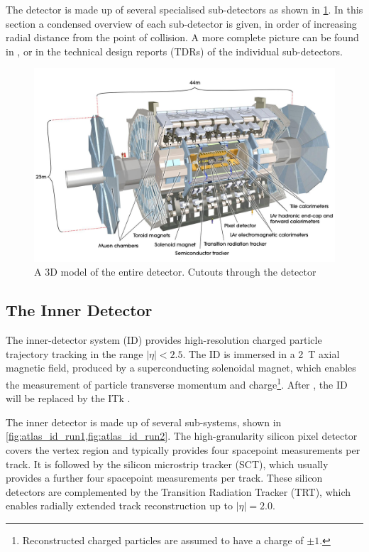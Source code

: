 The detector is made up of several specialised sub-detectors as shown in \cref{fig:atlas_detector}.
In this section a condensed overview of each sub-detector is given, in order of increasing radial distance from the point of collision.
A more complete picture can be found in , or in the technical design reports (TDRs) of the individual sub-detectors.

\begin{figure}[!htpb]
  \centering
  \includegraphics[width=0.9\linewidth]{chapters/2.detector/figs/atlas_detector.jpg}
  \caption{
    A 3D model of the entire \ATLAS detector. 
    Cutouts through the detector }
  \label{fig:atlas_detector}
\end{figure}
%


\subsection{The Inner Detector}\label{sec:atlas_id}

The inner-detector system (ID) provides high-resolution charged particle trajectory tracking in the range $|\eta| < 2.5$.
The ID is immersed in a \SI{2}{\tesla} axial magnetic field, produced by a superconducting solenoidal magnet, which enables the measurement of particle transverse momentum and charge\footnote{Reconstructed charged particles are assumed to have a charge of $\pm 1$.}.
After \runthree, the ID will be replaced by the ITk \cite{ATLAS-TDR-30,ATLAS-TDR-25}.

The inner detector is made up of several sub-systems, shown in \cref{fig:atlas_id_run1,fig:atlas_id_run2}.
The high-granularity silicon pixel detector covers the vertex region and typically provides four spacepoint measurements per track.
It is followed by the silicon microstrip tracker (SCT), which usually provides a further four spacepoint measurements per track.
These silicon detectors are complemented by the Transition Radiation Tracker (TRT),
which enables radially extended track reconstruction up to \(|\eta| = 2.0\). 

